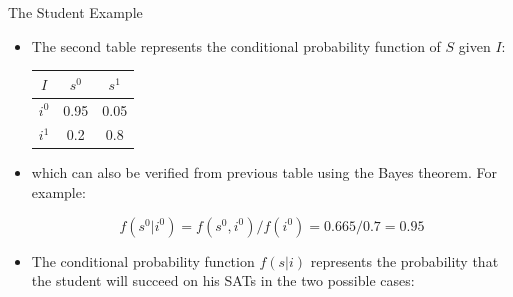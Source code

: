 \documentclass[handout]{beamer}
\begin{document}
\begin{frame}{The Student Example}
\scriptsize{
\begin{itemize}

\item The second table represents the conditional probability function of $S$ given $I$:

\begin{table}
\centering
  \begin{tabular}{c||cc} \hline
$I$ & $s^0$ & $s^1$  \\ \hline
$i^0$ & 0.95 & 0.05 \\
$i^1$ & 0.2 & 0.8 \\

\end{tabular} 
\end{table}

\item which can also be verified from previous table using the Bayes theorem. For example:

\begin{displaymath}
f(s^{0}|i^0)=f(s^{0},i^0)/f(i^0)= 0.665/0.7=0.95
\end{displaymath}

\item The conditional probability function $f(s| i)$ represents the probability that the student will succeed on his SATs in the two possible cases:


\end{itemize}



} 

\end{frame}
\end{document}
